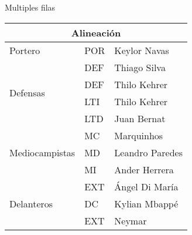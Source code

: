 \documentclass{article}
\begin{document}
Multiples filas\\
\begin{tabular}{|l|l|l|}
    \hline
    \multicolumn{3}{|c|}{Alineación}\\
    \hline
    Portero                         &POR &  Keylor Navas\\ \hline
    \multirow{4}{*}{Defensas}       &DEF &  Thiago Silva\\
                                    &DEF &  Thilo Kehrer \\
                                    &LTI & Thilo Kehrer\\
                                    &LTD &  Juan Bernat	\\ \hline
    \multirow{3}{*}{Mediocampistas} &MC &  Marquinhos\\ 
                                    &MD &  Leandro Paredes\\
                                    &MI &  Ander Herrera\\ \hline
    \multirow{3}{*}{Delanteros}     &EXT &  Ángel Di María\\
                                    &DC &  Kylian Mbappé\\
                                    &EXT &  Neymar\\ \hline
\end{tabular}
\end{document}
